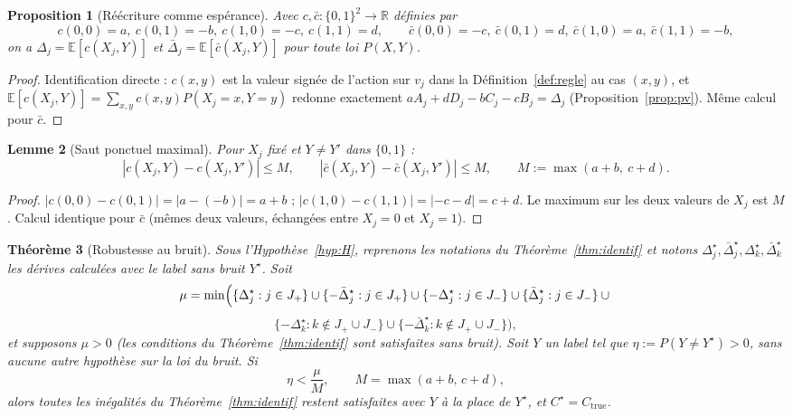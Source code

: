 \documentclass[12pt,a4paper]{article}
\newtheorem{theorem}{Théorème}
\newtheorem{lemma}[theorem]{Lemme}
\newtheorem{proposition}[theorem]{Proposition}
\theoremstyle{remark}
\begin{document}
\begin{proposition}[Réécriture comme espérance]\label{prop:c-func}
Avec $c,\bar c:\{0,1\}^2\to\mathbb R$ définies par
\[
  c(0,0)=a,\ c(0,1)=-b,\ c(1,0)=-c,\ c(1,1)=d, \qquad
  \bar c(0,0)=-c,\ \bar c(0,1)=d,\ \bar c(1,0)=a,\ \bar c(1,1)=-b,
\]
on a $\Delta_j=\mathbb E[c(X_j,Y)]$ et $\bar\Delta_j=\mathbb E[\bar c(X_j,Y)]$
pour toute loi $P(X,Y)$.
\end{proposition}

\begin{proof}
Identification directe : $c(x,y)$ est la valeur signée de l'action sur
$v_j$ dans la Définition~\ref{def:regle} au cas $(x,y)$, et
$\mathbb E[c(X_j,Y)]=\sum_{x,y}c(x,y)P(X_j{=}x,Y{=}y)$ redonne exactement
$aA_j+dD_j-bC_j-cB_j=\Delta_j$ (Proposition~\ref{prop:pv}). Même calcul pour $\bar c$.
\end{proof}

\begin{lemma}[Saut ponctuel maximal]\label{lem:jump}
Pour $X_j$ fixé et $Y\ne Y'$ dans $\{0,1\}$ :
\[
  |c(X_j,Y)-c(X_j,Y')|\le M, \qquad |\bar c(X_j,Y)-\bar c(X_j,Y')|\le M,
  \qquad M:=\max(a+b,\ c+d).
\]
\end{lemma}

\begin{proof}
$|c(0,0)-c(0,1)|=|a-(-b)|=a+b$ ; $|c(1,0)-c(1,1)|=|-c-d|=c+d$. Le maximum
sur les deux valeurs de $X_j$ est $M$. Calcul identique pour $\bar c$ (mêmes
deux valeurs, échangées entre $X_j=0$ et $X_j=1$).
\end{proof}

\begin{theorem}[Robustesse au bruit]\label{thm:bruit}
Sous l'Hypothèse~\ref{hyp:H}, reprenons les notations du
Théorème~\ref{thm:identif} et notons
$\Delta_j^\star,\bar\Delta_j^\star,\Delta_k^\star,\bar\Delta_k^\star$ les
dérives calculées avec le label sans bruit $Y^\star$. Soit
\[
  \mu = \min\Bigl(
    \{\Delta_j^\star : j\in J_+\} \cup \{-\bar\Delta_j^\star : j\in J_+\} \cup
    \{-\Delta_j^\star : j\in J_-\} \cup \{\bar\Delta_j^\star : j\in J_-\} \cup{}
  \]
  \[
    \{-\Delta_k^\star : k\notin J_+\cup J_-\} \cup \{-\bar\Delta_k^\star : k\notin J_+\cup J_-\}
  \Bigr),
\]
et supposons $\mu>0$ (les conditions du Théorème~\ref{thm:identif} sont
satisfaites sans bruit). Soit $Y$ un label tel que $\eta:=P(Y\ne Y^\star)>0$,
sans aucune autre hypothèse sur la loi du bruit. Si
\[
  \boxed{\eta < \frac{\mu}{M}, \qquad M=\max(a+b,\,c+d),}
\]
alors toutes les inégalités du Théorème~\ref{thm:identif} restent
satisfaites avec $Y$ à la place de $Y^\star$, et $C^\star=C_{\mathrm{true}}$.
\end{theorem}
\end{document}

